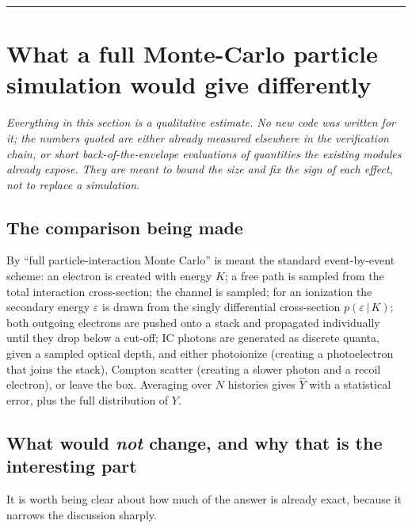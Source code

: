 \documentclass[11pt,a4paper]{article}
\newcommand{\eps}{\varepsilon}
\begin{document}
\bigskip
\hrule

\section{What a full Monte-Carlo particle simulation would give differently}
\label{sec:mc}

\noindent
\emph{Everything in this section is a qualitative estimate.  No new code was
written for it; the numbers quoted are either already measured elsewhere in the
verification chain, or short back-of-the-envelope evaluations of quantities the
existing modules already expose.  They are meant to bound the size and fix the
\emph{sign} of each effect, not to replace a simulation.}

\subsection{The comparison being made}

By ``full particle-interaction Monte Carlo'' is meant the standard
event-by-event scheme: an electron is created with energy $K$; a free path is
sampled from the total interaction cross-section; the channel is sampled;
for an ionization the secondary energy $\eps$ is drawn from the singly
differential cross-section $p(\eps\,|\,K)$; both outgoing electrons are pushed
onto a stack and propagated individually until they drop below a cut-off;
IC photons are generated as discrete quanta, given a sampled optical depth,
and either photoionize (creating a photoelectron that joins the stack),
Compton scatter (creating a slower photon and a recoil electron), or leave the
box.  Averaging over $N$ histories gives $\hat Y$ with a statistical error, plus
the full distribution of $Y$.

\subsection{What would \emph{not} change, and why that is the interesting part}

It is worth being clear about how much of the answer is already exact, because
it narrows the discussion sharply.
\end{document}
